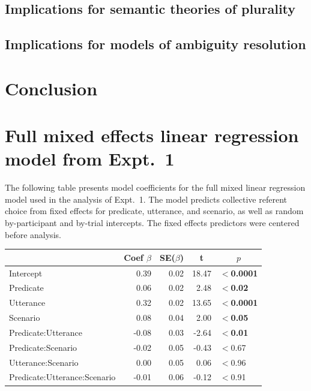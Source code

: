 \documentclass[linguex]{sp}
\begin{document}
\subsection{Implications for semantic theories of plurality}


\subsection{Implications for models of ambiguity resolution}


\section{Conclusion}


\appendix
\section{Full mixed effects linear regression model from Expt.~1}\label{expt1results}


The following table presents model coefficients for the full mixed linear regression model used in the analysis of Expt.~1. The model predicts collective referent choice from fixed effects for predicate, utterance, and scenario, as well as random by-participant and by-trial intercepts. The fixed effects predictors were centered before analysis.

\begin{center}

\begin{tabular}{lrrrl}\toprule
	&	Coef $\beta$	&	SE($\beta$)	&	\multicolumn{1}{c}{ \textbf{t}}	&	\multicolumn{1}{c}{$p$}\\ \midrule
Intercept	&	0.39	&	0.02	&	18.47	&	\textbf{$<$0.0001}\\
Predicate	&	0.06	&	0.02	&	2.48	&	\textbf{$<$0.02}\\
Utterance	&	0.32	&	0.02	&	13.65	&	\textbf{$<$0.0001}\\
Scenario	&	0.08	&	0.04	&	2.00	&	\textbf{$<$0.05}\\
Predicate:Utterance	&	-0.08	&	0.03	&	-2.64	&	\textbf{$<$0.01}\\
Predicate:Scenario	&	-0.02	&	0.05	&	-0.43	&	$<$0.67\\
Utterance:Scenario	&	0.00	&	0.05	&	0.06	&	$<$0.96\\
Predicate:Utterance:Scenario	&	-0.01	&	0.06	&	-0.12	&	$<$0.91\\
\bottomrule
\end{tabular}

\end{center}
 
\end{document}
